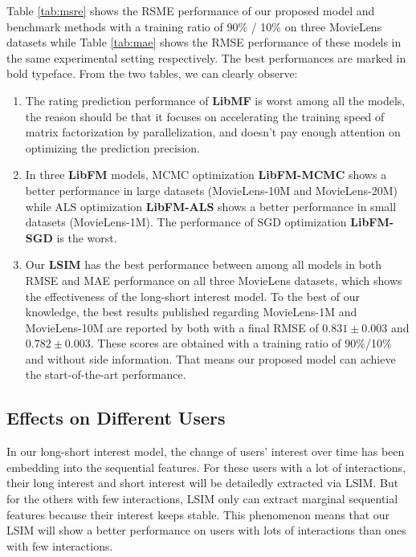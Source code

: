 \documentclass{llncs}
\begin{document}
Table \ref{tab:msre} shows the RSME performance of our proposed model and benchmark methods 
with a training ratio of 90\% / 10\% on three MovieLens datasets while Table \ref{tab:mae}
shows the RMSE performance of these models in the same experimental setting respectively.
The best performances are marked in bold typeface.
From the two tables, we can clearly observe:
\begin{enumerate}
	\item The rating prediction performance of \textbf{LibMF} is worst among all the models,
	the reason should be that it focuses on accelerating the training speed of matrix
	factorization by parallelization, and doesn't pay enough attention on optimizing
	the prediction precision.
	\item In three \textbf{LibFM} models, MCMC optimization \textbf{LibFM-MCMC} shows
	a better performance in large datasets (MovieLens-10M and MovieLens-20M) while
	ALS optimization \textbf{LibFM-ALS} shows a better performance in small datasets
	(MovieLens-1M). The performance of SGD optimization \textbf{LibFM-SGD} is the worst.
	\item Our \textbf{LSIM} has the best performance between among all models in both RMSE
	and MAE performance on all three MovieLens datasets, which shows the effectiveness
	of the long-short interest model. To the best of our knowledge, the best results
	published regarding MovieLens-1M and MovieLens-10M are reported by both
	\cite{lee2013local, sedhain2015autorec} with a final RMSE of $0.831 \pm 0.003$
	and $0.782 \pm 0.003$. These scores are obtained with a training ratio of
	90\%/10\% and without side information. That means our proposed model can achieve
	the start-of-the-art performance.
\end{enumerate}

\subsection{Effects on Different Users}
In our long-short interest model, the change of users' interest over time has been
embedding into the sequential features. For these users with a lot of interactions,
their long interest and short interest will be detailedly extracted via LSIM.
But for the others with few interactions, LSIM only can extract marginal
sequential features because their interest keeps stable.
This phenomenon means that our LSIM will show a better performance on users with
lots of interactions than ones with few interactions.
\end{document}
